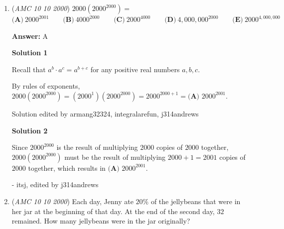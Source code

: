 \begin{enumerate}
\textbf{Solution 3}

The sum is the highest if two \href{https://artofproblemsolving.com/wiki/index.php?title=Factor}{factors} are the lowest.

 So, $1 \cdot 3 \cdot 667 = 2001$ and $1+3+667=671 \Longrightarrow \boxed{\text{(E) 671}}$.

 



\textbf{Solution 4 (Answer Choices)}

We see since $2 + 0 + 0 + 1$ is divisible by $3$, we can eliminate all of the first $4$ answer choices because they are way too small and get $\boxed{\text{(E) 671}}$ as our final answer.

 


 


	\item (\textit{AMC 10 10 2000}) $2000({2000}^{2000}) =$
$\textbf{(A)}\ {2000}^{2001} \qquad \textbf{(B)}\ {4000}^{2000} \qquad \textbf{(C)}\ {2000}^{4000} \qquad \textbf{(D)}\ {4,000,000}^{2000} \qquad\textbf{(E)}\ {2000}^{4,000,000}$

 \textbf{Answer: }A



\textbf{Solution 1}

Recall that $a^{b}\cdot a^{c} = a^{b+c}$ for any positive real numbers $a, b, c$.

 By rules of exponents, $2000\left(2000^{2000}\right) = \left(2000^{1}\right)\left(2000^{2000}\right) = 2000^{2000+1} = \boxed{\textbf{(A) } 2000^{2001}}$.

 Solution edited by armang32324, integralarefun, j314andrews

 



\textbf{Solution 2}

Since $2000^2000$ is the result of multiplying $2000$ copies of $2000$ together, $2000\left(2000^{2000}\right)$ must be the result of multiplying $2000 + 1 = 2001$ copies of $2000$ together, which results in $\boxed{\textbf{(A) } 2000^{2001}}$.

 - itsj, edited by j314andrews

 


	\item (\textit{AMC 10 10 2000}) Each day, Jenny ate $20\%$ of the jellybeans that were in her jar at the beginning of that day. At the end of the second day, $32$ remained. How many jellybeans were in the jar originally?



\end{enumerate}
